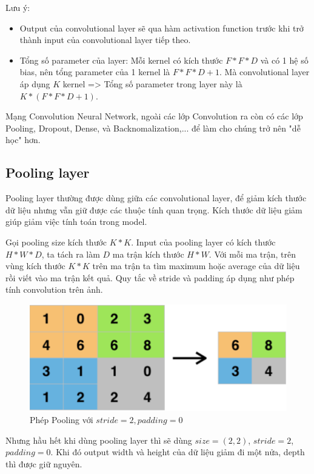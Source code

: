 Lưu ý:
\begin{itemize}
\item Output của convolutional layer sẽ qua hàm activation function trước khi trở thành input của convolutional layer tiếp theo.
\item Tổng số parameter của layer: Mỗi kernel có kích thước $F*F*D$ và có 1 hệ số bias, nên tổng parameter của 1 kernel là $F*F*D + 1$. Mà convolutional layer áp dụng $K$ kernel => Tổng số parameter trong layer này là $K * (F*F*D + 1)$.
\end{itemize}
Mạng Convolution Neural Network, ngoài các lớp Convolution ra còn có các lớp Pooling, Dropout, Dense, và Backnomalization,... để làm cho chúng trở nên "dễ học" hơn.


\subsection{Pooling layer}
\label{ss:Pooling}
Pooling layer thường được dùng giữa các convolutional layer, để giảm kích thước dữ liệu nhưng vẫn giữ được các thuộc tính quan trọng. Kích thước dữ liệu giảm giúp giảm việc tính toán trong model.

Gọi pooling size kích thước $K*K$. Input của pooling layer có kích thước $H*W*D$, ta tách ra làm $D$ ma trận kích thước $H*W$. Với mỗi ma trận, trên vùng kích thước $K*K$ trên ma trận ta tìm maximum hoặc average của dữ liệu rồi viết vào ma trận kết quả. Quy tắc về stride và padding áp dụng như phép tính convolution trên ảnh.

\FloatBarrier
\begin{figure}[htp]
\begin{center}
\includegraphics[scale=0.3]{chap2/c2_figs/9.jpg}
\end{center}
\caption{Phép Pooling với $stride=2, padding=0$}
\label{fig:pooling}
\end{figure}
\FloatBarrier

Nhưng hầu hết khi dùng pooling layer thì sẽ dùng $size=(2,2)$, $stride=2$, $padding=0$. Khi đó output width và height của dữ liệu giảm đi một nửa, depth thì được giữ nguyên.

